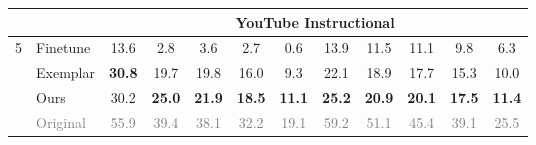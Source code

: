 \begin{table}[!ht]
{\begin{tabular}{clcccccccccc}
&&\multicolumn{10}{c}{YouTube Instructional}\\ \midrule
\multirow{4}{*}{5}& Finetune & 13.6 & 2.8 & 3.6 & 2.7 & 0.6 & 13.9 & 11.5 & 11.1 & 9.8 & 6.3 \\
& Exemplar & \textbf{30.8} & 19.7 & 19.8 & 16.0 & 9.3 & 22.1 & 18.9 & 17.7 & 15.3 & 10.0 \\
& \cellcolor{gray!30}Ours & \cellcolor{gray!30}30.2 & \cellcolor{gray!30}\textbf{25.0} & \cellcolor{gray!30}\textbf{21.9}& \cellcolor{gray!30}\textbf{18.5} & \cellcolor{gray!30}\textbf{11.1} & \cellcolor{gray!30}\textbf{25.2} & \cellcolor{gray!30}\textbf{20.9} & \cellcolor{gray!30}\textbf{20.1} & \cellcolor{gray!30}\textbf{17.5} & \cellcolor{gray!30}\textbf{11.4} \\
&\textcolor{gray}{Original} & \textcolor{gray}{55.9} & \textcolor{gray}{39.4} & \textcolor{gray}{38.1} & \textcolor{gray}{32.2} & \textcolor{gray}{19.1} & \textcolor{gray}{59.2} & \textcolor{gray}{51.1} & \textcolor{gray}{45.4} & \textcolor{gray}{39.1} & \textcolor{gray}{25.5} \\ \bottomrule
\end{tabular}}
\label{tab:all}
\end{table}